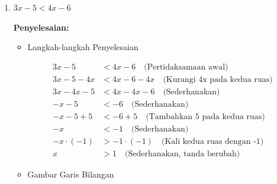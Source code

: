 \documentclass{article}
\begin{document}
\begin{enumerate}
\begin{itemize}
    \item HP: $\left[-\frac{10}{3}, \infty\right)$
    \end{itemize}
    
    \item $3x-5 < 4x-6$
    
    \textbf{Penyelesaian:}
    
    \begin{itemize}
    \item Langkah-langkah Penyelesaian
    
    \begin{align}
    3x - 5 &< 4x - 6 \quad \text{(Pertidaksamaan awal)} \\
    3x - 5 - 4x &< 4x - 6 - 4x \quad \text{(Kurangi 4x pada kedua ruas)} \\
    3x - 4x - 5 &< 4x - 4x - 6 \quad \text{(Sederhanakan)} \\
    -x - 5 &< -6 \quad \text{(Sederhanakan)} \\
    -x - 5 + 5 &< -6 + 5 \quad \text{(Tambahkan 5 pada kedua ruas)} \\
    -x &< -1 \quad \text{(Sederhanakan)} \\
    -x \cdot (-1) &> -1 \cdot (-1) \quad \text{(Kali kedua ruas dengan -1)} \\
    x &> 1 \quad \text{(Sederhanakan, tanda berubah)}
    \end{align}
    
    \item Gambar Garis Bilangan
    
    \begin{center}
    \end{center}
    

\end{itemize}
\end{enumerate}
\end{document}
